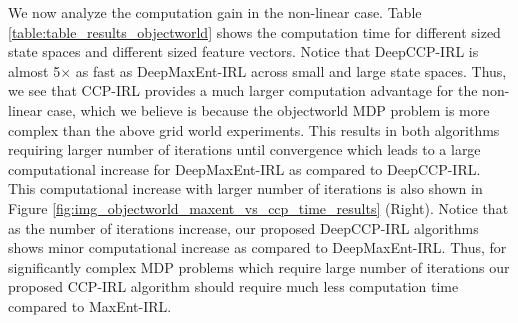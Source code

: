 \documentclass{article}
\begin{document}
We now analyze the computation gain in the non-linear case. Table \ref{table:table_results_objectworld} shows the computation time for different sized state spaces and different sized feature vectors. Notice that DeepCCP-IRL is almost 5$\times$ as fast as DeepMaxEnt-IRL across small and large state spaces. Thus, we see that CCP-IRL provides a much larger computation advantage for the non-linear case, which we believe is because the objectworld MDP problem is more complex than the above grid world experiments.
This results in both algorithms requiring larger number of iterations until convergence which leads to a large computational increase for DeepMaxEnt-IRL as compared to DeepCCP-IRL. 
This computational increase with larger number of iterations is also shown in Figure \ref{fig:img_objectworld_maxent_vs_ccp_time_results} (Right).
Notice that as the number of iterations increase, our proposed DeepCCP-IRL algorithms shows minor computational increase as compared to DeepMaxEnt-IRL. 
Thus, for significantly complex MDP problems which require large number of iterations our proposed CCP-IRL algorithm should require much less computation time compared to MaxEnt-IRL.



\end{document}
